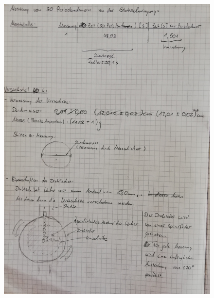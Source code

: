 \documentclass[11pt,a4paper]{article}
\begin{document}
\begin{figure}[H]
	\includegraphics[width = 1\linewidth]{S2.jpg}
	\centering
\end{figure}
\end{document}
